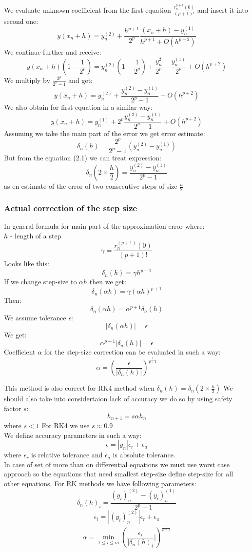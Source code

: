 We evaluate unknown coefficient from the first equation $ \frac{r_n^{p+1}(0)}{(p+1)!} $ and insert it into second one:
\[ y(x_n+h) = y_n^{(2)} + \frac{h^{p+1}}{2^p}\frac{(x_n+h) - y_n^{(1)}}{h^{p+1} + O(h^{p+2})} \]
We continue further and receive:
\[ y(x_n + h)(1-\frac{1}{2^p}) = y_n^{(2)}(1-\frac{1}{2^p}) + \frac{y_n^{2}}{2^p} - \frac{y_n^{(1)}}{2^p} + O(h^{p+2}) \]
We multiply by $\frac{2^p}{2^p - 1}$ and get:
\begin{equation}
y(x_n+h) = y_n^{(2)} + \frac{ y_n^{(2)} - y_n^{(1)} }{ 2^p - 1 } + O(h^{p+2})
\end{equation}
We also obtain for first equation in a similar way:
 \[ y(x_n+h) = y_n^{(1)} + 2^p\frac{y_n^{(2)} - y_n^{(1)}}{2^p - 1} + O(h^{p+2}) \]
Assuming we take the main part of the error we get error estimate:
\[ \delta_n(h) = \frac{2^p}{2^p-1}(y_n^{(2)} - y_n^{(1)}) \]
But from the equation (2.1) we can treat expression:
\[ \delta_n(2 \times \frac{h}{2}) = \frac{ y_n^{(2)} - y_n^{(1)}}{2^p - 1} \]
as en estimate of the error of two consecutive steps of size $\frac{h}{2}$
\subsubsection{Actual correction of the step size}
In general formula for main part of the approximation error where:
\\ $h$ - length of a step
\[ \gamma = \frac{r_n^{(p+1)}(0)}{(p+1)!} \]
Looks like this:
\[ \delta_n(h) = \gamma h^{p+1} \]
If we change step-size to $\alpha h$ then we get:
\[ \delta_n(\alpha h) = \gamma (\alpha h)^{p+1} \]
Then:
\[ \delta_n(\alpha h) = \alpha^{p+1} \delta_n (h) \]
We assume tolerance $\epsilon$:
\[ |\delta_n(\alpha h)| = \epsilon \]
We get:
\[ \alpha^{p+1}|\delta_n(h)| = \epsilon \]
Coefficient $\alpha$ for the step-size correction can be evaluated in such a way:
\[ \alpha = (\frac{\epsilon}{|\delta_n (h)|})^{\frac{1}{p+1}} \]

This method is also correct for RK4 method when $\delta_n(h) = \delta_n(2 \times \frac{h}{2}) $
We should also take into considertaion lack of accuracy we do so by using safety factor $s$:
\[ h_{n+1} = s \alpha h_n \]
where $ s < 1 $
For RK4 we use $ s \approx 0.9 $ \\
We define accuracy parameters in such a way:
\[ \epsilon = |y_n| \epsilon_r + \epsilon_a \]
where $\epsilon_r$ is relative tolerance and $\epsilon_a$ is absolute tolerance. \\
In case of set of more than on differential equations we must use worst case approach so the equations that need smallest step-size define step-size for all other equations.
\newpage
For RK methods we have following parameters:
\[ \delta_n(h)_i = \frac{(y_i)_n^{(2)} - (y_i)_n^{(1)}}{2^p - 1} \]
\[ \epsilon_i = |(y_i)_n^{(2)}| \epsilon_r + \epsilon_a \]
\[ \alpha = \min_{1 \leq i \leq m} (\frac{\epsilon_i}{|\delta_n(h)_i}|)^{\frac{1}{p+1}} \]

